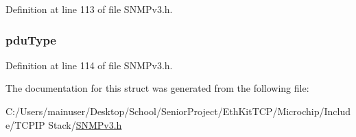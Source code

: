 Definition at line 113 of file S\+N\+M\+Pv3.\+h.

\hypertarget{structunregister_context_engine_i_d_ad106adfabb3dc56cdc2d52727d9771c5}{}
\subsubsection[{pdu\+Type}]{ pdu\+Type}\label{structunregister_context_engine_i_d_ad106adfabb3dc56cdc2d52727d9771c5}


Definition at line 114 of file S\+N\+M\+Pv3.\+h.



The documentation for this struct was generated from the following file\+:\begin{DoxyCompactItemize}
\item 
C\+:/\+Users/mainuser/\+Desktop/\+School/\+Senior\+Project/\+Eth\+Kit\+T\+C\+P/\+Microchip/\+Include/\+T\+C\+P\+I\+P Stack/\hyperlink{_s_n_m_pv3_8h}{S\+N\+M\+Pv3.\+h}\end{DoxyCompactItemize}
